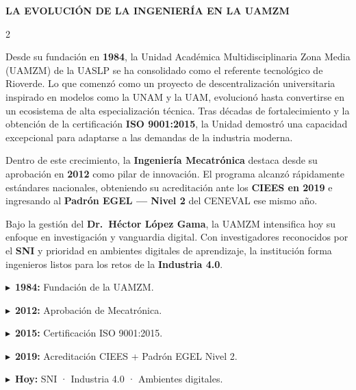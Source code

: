 \documentclass[10pt]{article}
\newcommand{\lineaNaranja}{%
  \noindent{\color{naranja}\rule{\linewidth}{1.5pt}}\par\vspace{3pt}}
\newcommand{\lineaGrisH}{%
  \noindent{\color{lineaGris}\rule{\linewidth}{0.4pt}}\par}
\newcommand{\itemBullet}[1]{%
  \vspace{2pt}\noindent
  \textcolor{naranja}{\small$\blacktriangleright$}\,%
  {\small\color{textoGris}#1}\par}
\newenvironment{cajaDato}[1]{%
  \begin{tcolorbox}[colback=naranjaClaro,colframe=naranja,
    arc=0pt,boxrule=1pt,title={\small\bfseries\color{naranja}#1},
    coltitle=naranja,
    attach boxed title to top left={yshift=-2mm,xshift=4mm},
    boxed title style={colback=blanco,colframe=naranja,arc=0pt,boxrule=0.8pt},
    left=7pt,right=7pt,top=9pt,bottom=6pt]
  \small\color{textoGris}\RaggedRight}{\end{tcolorbox}}
\begin{document}
{\fontsize{14}{17}\selectfont\bfseries\color{azulOscuro}
  LA EVOLUCIÓN DE LA INGENIERÍA EN LA UAMZM}\par
\vspace{2pt}
\lineaNaranja
\vspace{4pt}

\begin{multicols}{2}
\RaggedRight\small\color{textoGris}

Desde su fundación en \textbf{\color{azulOscuro}1984}, la Unidad
Académica Multidisciplinaria Zona Media (UAMZM) de la UASLP se ha
consolidado como el referente tecnológico de Rioverde. Lo que comenzó
como un proyecto de descentralización universitaria inspirado en modelos
como la UNAM y la UAM, evolucionó hasta convertirse en un ecosistema de
alta especialización técnica. Tras décadas de fortalecimiento y la
obtención de la certificación \textbf{\color{azulOscuro}ISO 9001:2015},
la Unidad demostró una capacidad excepcional para adaptarse a las
demandas de la industria moderna.

\vspace{4pt}
Dentro de este crecimiento, la \textbf{\color{azulOscuro}Ingeniería
Mecatrónica} destaca desde su aprobación en
\textbf{\color{naranja}2012} como pilar de innovación. El programa
alcanzó rápidamente estándares nacionales, obteniendo su acreditación
ante los \textbf{CIEES en 2019} e ingresando al
\textbf{Padrón EGEL — Nivel 2} del CENEVAL ese mismo año.

\columnbreak

Bajo la gestión del \textbf{\color{azulOscuro}Dr.\ Héctor López Gama},
la UAMZM intensifica hoy su enfoque en investigación y vanguardia
digital. Con investigadores reconocidos por el
\textbf{SNI} y prioridad en ambientes digitales de aprendizaje, la
institución forma ingenieros listos para los retos de la
\textbf{\color{naranja}Industria 4.0}.

\vspace{4pt}
\begin{cajaDato}{HITOS CLAVE}
  \itemBullet{\textbf{1984:} Fundación de la UAMZM.}
  \itemBullet{\textbf{2012:} Aprobación de Mecatrónica.}
  \itemBullet{\textbf{2015:} Certificación ISO 9001:2015.}
  \itemBullet{\textbf{2019:} Acreditación CIEES + Padrón EGEL Nivel 2.}
  \itemBullet{\textbf{Hoy:} SNI · Industria 4.0 · Ambientes digitales.}
\end{cajaDato}

\end{multicols}

\vspace{6pt}
\lineaGrisH
\vspace{5pt}
\end{document}
